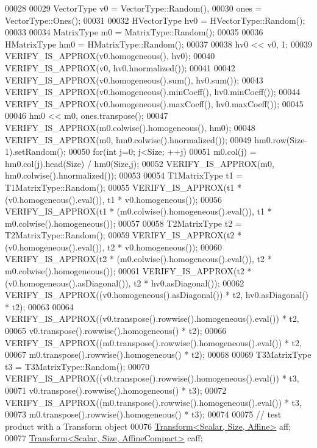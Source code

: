\begin{DoxyCode}
00028 
00029   VectorType v0 = VectorType::Random(),
00030              ones = VectorType::Ones();
00031 
00032   HVectorType hv0 = HVectorType::Random();
00033 
00034   MatrixType m0 = MatrixType::Random();
00035 
00036   HMatrixType hm0 = HMatrixType::Random();
00037 
00038   hv0 << v0, 1;
00039   VERIFY\_IS\_APPROX(v0.homogeneous(), hv0);
00040   VERIFY\_IS\_APPROX(v0, hv0.hnormalized());
00041   
00042   VERIFY\_IS\_APPROX(v0.homogeneous().sum(), hv0.sum());
00043   VERIFY\_IS\_APPROX(v0.homogeneous().minCoeff(), hv0.minCoeff());
00044   VERIFY\_IS\_APPROX(v0.homogeneous().maxCoeff(), hv0.maxCoeff());
00045 
00046   hm0 << m0, ones.transpose();
00047   VERIFY\_IS\_APPROX(m0.colwise().homogeneous(), hm0);
00048   VERIFY\_IS\_APPROX(m0, hm0.colwise().hnormalized());
00049   hm0.row(Size-1).setRandom();
00050   \textcolor{keywordflow}{for}(\textcolor{keywordtype}{int} j=0; j<Size; ++j)
00051     m0.col(j) = hm0.col(j).head(Size) / hm0(Size,j);
00052   VERIFY\_IS\_APPROX(m0, hm0.colwise().hnormalized());
00053 
00054   T1MatrixType t1 = T1MatrixType::Random();
00055   VERIFY\_IS\_APPROX(t1 * (v0.homogeneous().eval()), t1 * v0.homogeneous());
00056   VERIFY\_IS\_APPROX(t1 * (m0.colwise().homogeneous().eval()), t1 * m0.colwise().homogeneous());
00057 
00058   T2MatrixType t2 = T2MatrixType::Random();
00059   VERIFY\_IS\_APPROX(t2 * (v0.homogeneous().eval()), t2 * v0.homogeneous());
00060   VERIFY\_IS\_APPROX(t2 * (m0.colwise().homogeneous().eval()), t2 * m0.colwise().homogeneous());
00061   VERIFY\_IS\_APPROX(t2 * (v0.homogeneous().asDiagonal()), t2 * hv0.asDiagonal());
00062   VERIFY\_IS\_APPROX((v0.homogeneous().asDiagonal()) * t2, hv0.asDiagonal() * t2);
00063 
00064   VERIFY\_IS\_APPROX((v0.transpose().rowwise().homogeneous().eval()) * t2,
00065                     v0.transpose().rowwise().homogeneous() * t2);
00066   VERIFY\_IS\_APPROX((m0.transpose().rowwise().homogeneous().eval()) * t2,
00067                     m0.transpose().rowwise().homogeneous() * t2);
00068 
00069   T3MatrixType t3 = T3MatrixType::Random();
00070   VERIFY\_IS\_APPROX((v0.transpose().rowwise().homogeneous().eval()) * t3,
00071                     v0.transpose().rowwise().homogeneous() * t3);
00072   VERIFY\_IS\_APPROX((m0.transpose().rowwise().homogeneous().eval()) * t3,
00073                     m0.transpose().rowwise().homogeneous() * t3);
00074 
00075   \textcolor{comment}{// test product with a Transform object}
00076   \hyperlink{group___geometry___module_class_eigen_1_1_transform}{Transform<Scalar, Size, Affine>} aff;
00077   \hyperlink{group___geometry___module_class_eigen_1_1_transform}{Transform<Scalar, Size, AffineCompact>} caff;

\end{DoxyCode}

